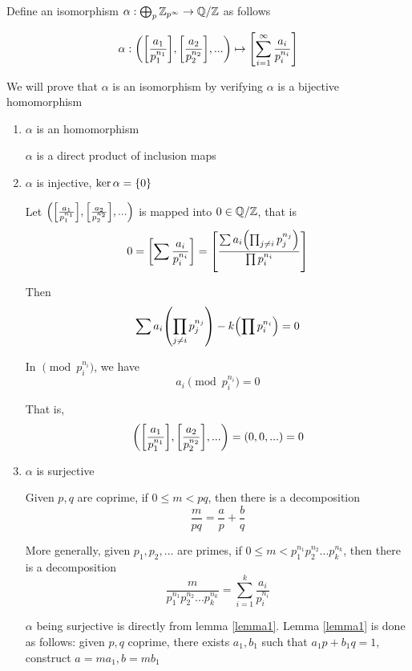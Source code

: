 \documentclass{article}
\begin{document}
Define an isomorphism $\alpha: \bigoplus_p \mathbb{Z}_{p^\infty} \to \mathbb{Q} / \mathbb{Z}$ as follows

$$
    \alpha: \tuple*{\bracket*{\frac{a_1}{p_1^{n_1}}}, \bracket*{\frac{a_2}{p_2^{n_2}}}, ...} \mapsto \bracket*{\sum_{i=1}^\infty \frac{a_i}{p_i^{n_i}}}
$$



We will prove that $\alpha$ is an isomorphism by verifying $\alpha$ is a bijective homomorphism

\begin{enumerate}
    \item $\alpha$ is an homomorphism

    $\alpha$ is a direct product of inclusion maps

    \item $\alpha$ is injective, $\ker \alpha = \{0\}$

    Let $\tuple*{\bracket*{\frac{a_1}{p_1^{n_1}}}, \bracket*{\frac{a_2}{p_2^{n_2}}}, ...}$ is mapped into $0 \in \mathbb{Q} / \mathbb{Z}$, that is
    $$
        0 = \bracket*{\sum \frac{a_i}{p_i^{n_i}}} = \bracket*{\frac{\sum a_i \tuple*{\prod_{j \neq i} p_j^{n_j}}}{\prod p_i^{n_i}}}
    $$

    Then
    $$
        \sum a_i \tuple*{\prod_{j \neq i} p_j^{n_j}} - k \tuple*{\prod p_i^{n_i}} = 0
    $$

    In $\pmod{p_i^{n_i}}$, we have
    $$
        a_i \pmod{p_i^{n_i}} = 0
    $$

    That is, 
    $$
        \tuple*{\bracket*{\frac{a_1}{p_1^{n_1}}}, \bracket*{\frac{a_2}{p_2^{n_2}}}, ...} = \tuple*{0, 0, ...} = 0
    $$

    \item $\alpha$ is surjective

    \begin{lemma}
        \label{lemma1}
        Given $p, q$ are coprime, if $0 \leq m < pq$, then there is a decomposition
        $$
            \frac{m}{pq} = \frac{a}{p} + \frac{b}{q}
        $$
    
        More generally, given $p_1, p_2, ...$ are primes, if $0 \leq m < p_1^{n_1} p_2^{n_2} ... p_k^{n_k}$, then there is a decomposition
        $$
            \frac{m}{p_1^{n_1} p_2^{n_2} ... p_k^{n_k}} = \sum_{i=1}^k \frac{a_i}{p_i^{n_i}}
        $$
    \end{lemma}

    $\alpha$ being surjective is directly from lemma \ref{lemma1}. Lemma \ref{lemma1} is done as follows: given $p, q$ coprime, there exists $a_1, b_1$ such that $a_1 p + b_1 q = 1$, construct $a = m a_1, b = m b_1$
    
\end{enumerate}
\end{document}
